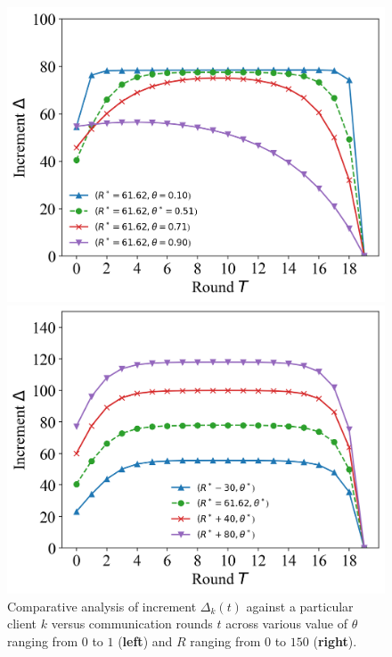 \documentclass{article}
\theoremstyle{plain}
\theoremstyle{definition}
\theoremstyle{remark}
\begin{document}
\begin{figure}
	\begin{minipage}{0.49\linewidth}
		\centerline{\includegraphics[width=\textwidth]{figures/figure_62_B.png}}
	\end{minipage}
	\begin{minipage}{0.49\linewidth}
		\centerline{\includegraphics[width=\textwidth]{figures/figure_71_B.png}}
	\end{minipage}
	\caption{Comparative analysis of increment $\Delta_k(t)$ against a particular client $k$ versus communication rounds $t$ across various value of $\theta$ ranging from $0$ to $1$ (\textbf{left}) and $R$ ranging from $0$ to $150$ (\textbf{right}).}
  \label{fig:server_increment}
\end{figure}
\end{document}

